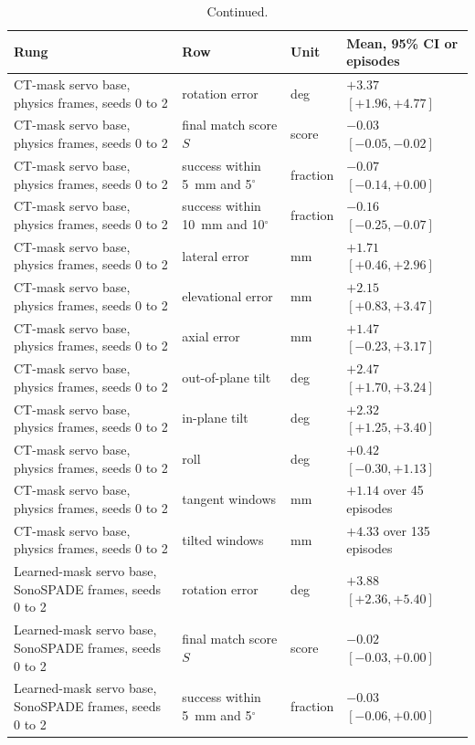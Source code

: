 \begin{table}[tp]
\renewcommand{\baselinestretch}{1}\scriptsize
\ContinuedFloat
\caption[]{Continued.}
\centering
\setlength{\tabcolsep}{3pt}
\begin{tabularx}{\textwidth}{@{}l >{\raggedright\arraybackslash}X l l@{}}
\toprule
Rung & Row & Unit & Mean, 95\% CI or episodes \\
\midrule
CT-mask servo base, physics frames, seeds 0 to 2 & rotation error & deg & $+3.37$ $[+1.96, +4.77]$ \\
CT-mask servo base, physics frames, seeds 0 to 2 & final match score $S$ & score & $-0.03$ $[-0.05, -0.02]$ \\
CT-mask servo base, physics frames, seeds 0 to 2 & success within 5~mm and 5$^\circ$ & fraction & $-0.07$ $[-0.14, +0.00]$ \\
CT-mask servo base, physics frames, seeds 0 to 2 & success within 10~mm and 10$^\circ$ & fraction & $-0.16$ $[-0.25, -0.07]$ \\
CT-mask servo base, physics frames, seeds 0 to 2 & lateral error & mm & $+1.71$ $[+0.46, +2.96]$ \\
CT-mask servo base, physics frames, seeds 0 to 2 & elevational error & mm & $+2.15$ $[+0.83, +3.47]$ \\
CT-mask servo base, physics frames, seeds 0 to 2 & axial error & mm & $+1.47$ $[-0.23, +3.17]$ \\
CT-mask servo base, physics frames, seeds 0 to 2 & out-of-plane tilt & deg & $+2.47$ $[+1.70, +3.24]$ \\
CT-mask servo base, physics frames, seeds 0 to 2 & in-plane tilt & deg & $+2.32$ $[+1.25, +3.40]$ \\
CT-mask servo base, physics frames, seeds 0 to 2 & roll & deg & $+0.42$ $[-0.30, +1.13]$ \\
CT-mask servo base, physics frames, seeds 0 to 2 & tangent windows & mm & $+1.14$ over 45 episodes \\
CT-mask servo base, physics frames, seeds 0 to 2 & tilted windows & mm & $+4.33$ over 135 episodes \\
Learned-mask servo base, SonoSPADE frames, seeds 0 to 2 & rotation error & deg & $+3.88$ $[+2.36, +5.40]$ \\
Learned-mask servo base, SonoSPADE frames, seeds 0 to 2 & final match score $S$ & score & $-0.02$ $[-0.03, +0.00]$ \\
Learned-mask servo base, SonoSPADE frames, seeds 0 to 2 & success within 5~mm and 5$^\circ$ & fraction & $-0.03$ $[-0.06, +0.00]$ \\

\end{tabularx}
\end{table}

